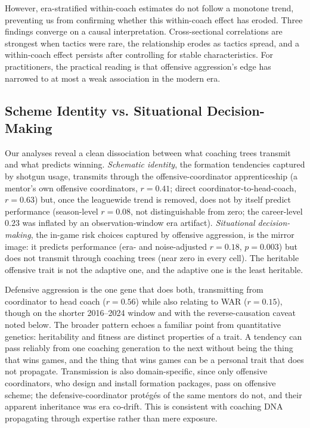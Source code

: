 \documentclass[USenglish]{article}
\theoremstyle{dgthm}
\theoremstyle{dgdef}
\begin{document}
However, era-stratified within-coach estimates do not follow a monotone trend, preventing us from confirming whether this within-coach effect has eroded. Three findings converge on a causal interpretation. Cross-sectional correlations are strongest when tactics were rare, the relationship erodes as tactics spread, and a within-coach effect persists after controlling for stable characteristics. For practitioners, the practical reading is that offensive aggression's edge has narrowed to at most a weak association in the modern era.

\subsection{Scheme Identity vs. Situational Decision-Making}

Our analyses reveal a clean dissociation between what coaching trees transmit and what predicts winning. \emph{Schematic identity}, the formation tendencies captured by shotgun usage, transmits through the offensive-coordinator apprenticeship (a mentor's own offensive coordinators, $r=0.41$; direct coordinator-to-head-coach, $r=0.63$) but, once the leaguewide trend is removed, does not by itself predict performance (season-level $r=0.08$, not distinguishable from zero; the career-level $0.23$ was inflated by an observation-window era artifact). \emph{Situational decision-making}, the in-game risk choices captured by offensive aggression, is the mirror image: it predicts performance (era- and noise-adjusted $r=0.18$, $p=0.003$) but does not transmit through coaching trees (near zero in every cell). The heritable offensive trait is not the adaptive one, and the adaptive one is the least heritable.

Defensive aggression is the one gene that does both, transmitting from coordinator to head coach ($r=0.56$) while also relating to WAR ($r=0.15$), though on the shorter 2016--2024 window and with the reverse-causation caveat noted below. The broader pattern echoes a familiar point from quantitative genetics: heritability and fitness are distinct properties of a trait. A tendency can pass reliably from one coaching generation to the next without being the thing that wins games, and the thing that wins games can be a personal trait that does not propagate. Transmission is also domain-specific, since only offensive coordinators, who design and install formation packages, pass on offensive scheme; the defensive-coordinator prot\'{e}g\'{e}s of the same mentors do not, and their apparent inheritance was era co-drift. This is consistent with coaching DNA propagating through expertise rather than mere exposure.
\end{document}

